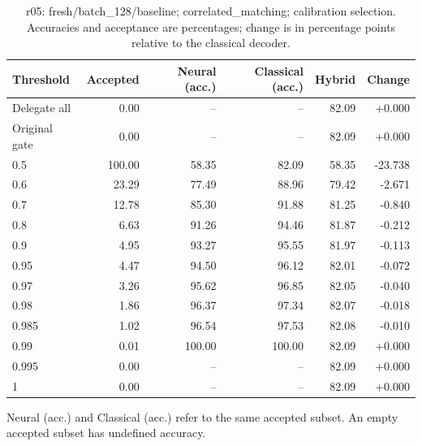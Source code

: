 \begin{table}[htbp]
\centering\small
\setlength{\tabcolsep}{3pt}
\caption{r05: fresh/batch\_128/baseline; correlated\_matching; calibration selection. Accuracies and acceptance are percentages; change is in percentage points relative to the classical decoder.}
\begin{tabular}{lrrrrr}
\toprule
Threshold & Accepted & Neural (acc.) & Classical (acc.) & Hybrid & Change \\
\midrule
Delegate all & 0.00 & -- & -- & 82.09 & +0.000 \\
Original gate & 0.00 & -- & -- & 82.09 & +0.000 \\
0.5 & 100.00 & 58.35 & 82.09 & 58.35 & -23.738 \\
0.6 & 23.29 & 77.49 & 88.96 & 79.42 & -2.671 \\
0.7 & 12.78 & 85.30 & 91.88 & 81.25 & -0.840 \\
0.8 & 6.63 & 91.26 & 94.46 & 81.87 & -0.212 \\
0.9 & 4.95 & 93.27 & 95.55 & 81.97 & -0.113 \\
0.95 & 4.47 & 94.50 & 96.12 & 82.01 & -0.072 \\
0.97 & 3.26 & 95.62 & 96.85 & 82.05 & -0.040 \\
0.98 & 1.86 & 96.37 & 97.34 & 82.07 & -0.018 \\
0.985 & 1.02 & 96.54 & 97.53 & 82.08 & -0.010 \\
0.99 & 0.01 & 100.00 & 100.00 & 82.09 & +0.000 \\
0.995 & 0.00 & -- & -- & 82.09 & +0.000 \\
1 & 0.00 & -- & -- & 82.09 & +0.000 \\
\bottomrule
\end{tabular}
\par\smallskip\footnotesize Neural (acc.) and Classical (acc.) refer to the same accepted subset. An empty accepted subset has undefined accuracy.
\end{table}
